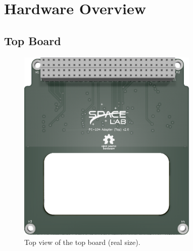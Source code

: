 %
%
%
%
%

%
%
%
%
%
%

\chapter{Hardware Overview} \label{ch:hardware}

\cite{picoblade}

\section{Top Board}

\begin{figure}[!htb]
    \begin{center}
        \includegraphics[width=8.636cm]{figures/pc104-adapter-top-top}
        \caption{Top view of the top board (real size).}
        \label{fig:top-board-top}
    \end{center}
\end{figure}

